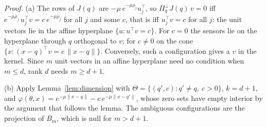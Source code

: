 \documentclass{article}
\begin{document}
\textit{Proof.} (a) The rows of $J(q)$ are $-\mu\, e^{-\mu\rho_j} u_j^{\top}$, so $\Pi_q^{\perp} J(q)\, v = 0$ iff $e^{-\mu\rho_j}\, u_j^{\top} v = c\, e^{-\mu\rho_j}$ for all $j$ and some $c$, that is iff $u_j^{\top} v = c$ for all $j$: the unit vectors lie in the affine hyperplane $\{u : u^{\top} v = c\}$. For $c = 0$ the sensors lie on the hyperplane through $q$ orthogonal to $v$; for $c \ne 0$ on the cone $\{x : (x - q)^{\top} v = c\, \lVert x - q \rVert\}$. Conversely, such a configuration gives a $v$ in the kernel. Since $m$ unit vectors in an affine hyperplane need no condition when $m \le d$, rank $d$ needs $m \ge d + 1$.

(b) Apply Lemma~\ref{lem:dimension} with $\Theta = \{(q', c) : q' \ne q,\ c > 0\}$, $k = d + 1$, and $\varphi(\theta, x) = e^{-\mu \lVert x - q \rVert} - c\, e^{-\mu \lVert x - q' \rVert}$, whose zero sets have empty interior by the argument that follows the lemma. The ambiguous configurations are the projection of $B_m$, which is null for $m > d + 1$.
\end{document}
